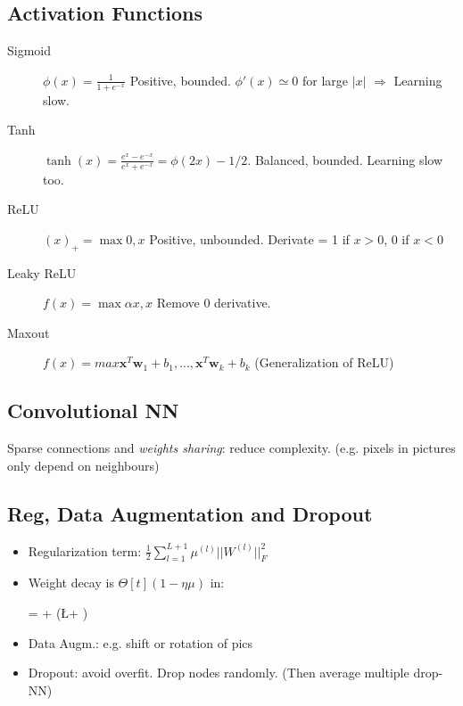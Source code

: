 \subsection{Activation Functions}
\begin{description}
 \item[Sigmoid] $\phi(x) = \frac{1}{1+e^{-x}}$ Positive, bounded. $\phi'(x) \simeq 0$ for large $|x|$ $\Rightarrow$ Learning slow.
 \item[Tanh] $\tanh(x) = \frac{e^x - e^{-x}}{e^x + e^{-x}} = \phi(2x) - 1/2$. Balanced, bounded. Learning slow too.
 \item[ReLU] $(x)_{+} = \max{0,x}$ Positive, unbounded. Derivate = 1 if $x>0$, 0 if $x<0$
 \item[Leaky ReLU] $f(x) = \max{\alpha x, x}$ Remove 0 derivative.
 \item[Maxout] $f(x) = max{\bm x^T\bm w_1 + b_1, ..., \bm x^T\bm w_k + b_k}$ (Generalization of ReLU)
\end{description}

 
\subsection{Convolutional NN} 

Sparse connections and \textit{weights sharing}: reduce complexity. (e.g. pixels in pictures only depend on neighbours)

 
\subsection{Reg, Data Augmentation and Dropout}

\begin{itemize}
	\item Regularization term: $\frac{1}{2} \sum_{l=1}^{L+1} \mu^{(l)} || W ^{(l)} ||  ^{2} _{F}$
	\item Weight decay is $\Theta[t](1-\eta \mu)$ in:
	\begin{myalign*}
	\Theta[t+1] = \Theta[t] + \eta (\nabla \L + \mu \Theta[t])
	\end{myalign*}
	\item Data Augm.: e.g. shift or rotation of pics
	\item Dropout: avoid overfit. Drop nodes randomly. (Then average multiple drop-NN)
\end{itemize}

